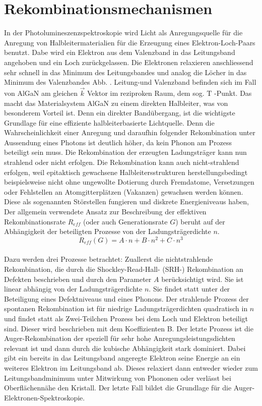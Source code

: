 
\thispagestyle{fancy}


\section{Rekombinationsmechanismen}

In der Photolumineszenzspektroskopie wird Licht als Anregungsquelle für die Anregung von Halbleitermaterialien für die Erzeugung eines Elektron-Loch-Paars benutzt. Dabe wird ein Elektron aus dem Valenzband in das Leitungsband angehoben und ein Loch zurückgelassen. Die Elektronen relaxieren anschliessend sehr schnell in das Minimum des Leitungsbandes und analog die Löcher in das Minimum des Valenzbandes Abb. . Leitung-und Valenzband befinden sich im Fall von AlGaN am gleichen $\vec{k}$ Vektor im reziproken Raum, dem sog. $\mathrm{T}$ -Punkt. Das macht das Materialsystem AlGaN zu einem direkten Halbleiter, was von besonderem Vorteil ist. Denn ein direkter Bandübergang, ist die wichtigste Grundlage für eine effiziente halbleiterbasierte Lichtquelle. Denn die Wahrscheinlichkeit einer Anregung und daraufhin folgender Rekombination unter Aussendung eines Photons ist deutlich höher, da kein Phonon am Prozess beteiligt sein muss. Die Rekombination der erzeugten Ladungsträger kann nun strahlend oder nicht erfolgen.
Die Rekombination kann auch nicht-strahlend erfolgen, weil epitaktisch gewachsene Halbleitersstrukturen herstellungsbedingt beispielsweise nicht ohne ungewollte Dotierung durch Fremdatome, Versetzungen oder Fehlstellen an Atomgitterplätzen (Vakanzen) gewachsen werden können. Diese als sogenannten Störstellen fungieren und diskrete Energieniveaus haben, 
Der allgemein verwendete Ansatz zur Beschreibung der effektiven Rekombinationsrate $R_{eff}$ (oder auch Generationsrate $G$) beruht auf der Abhängigkeit der beteiligten Prozesse von der Ladungsträgerdichte $n$. 
\\
\begin{equation}
    R_{eff} (G) = A \cdot n + B \cdot n^2 + C \cdot n^3 
\end{equation}
\\
Dazu werden drei Prozesse betrachtet: Zuallerst die nichtstrahlende Rekombination, die durch die Shockley-Read-Hall- (SRH-) Rekombination an Defekten beschrieben und durch den Parameter $A$ berücksichtigt wird. Sie ist linear abhängig von der Ladungsträgerdichte $n$. Sie findet statt unter der Beteiligung eines Defektniveaus und eines Phonons. Der strahlende Prozess der spontanen Rekombination ist für niedrige Ladungsträgerdichten quadratisch in $n$ und findet statt als Zwei-Teilchen Prozess bei dem Loch und Elektron beteiligt sind. Dieser wird beschrieben mit dem Koeffizienten B. 
Der letzte Prozess ist die Auger-Rekombination der speziell für sehr hohe Anregungsleistungsdichten relevant ist und dann durch die kubische Abhängigkeit stark dominiert. Dabei gibt ein bereits in das Leitungsband angeregte Elektron seine Energie an ein weiteres Elektron im Leitungsband ab. Dieses relaxiert dann entweder wieder zum Leitungsbandminimum unter Mitwirkung von Phononen oder verlässt bei Oberflächennähe den Kristall. Der letzte Fall bildet die Grundlage für die Auger-Elektronen-Spektroskopie. 

